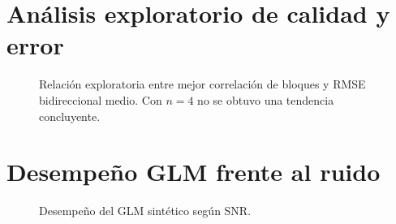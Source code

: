 \section{Análisis exploratorio de calidad y error}
\begin{figure}[H]
\centering
{}
\caption{Relación exploratoria entre mejor correlación de bloques y RMSE bidireccional medio. Con $n=4$ no se obtuvo una tendencia concluyente.}
\end{figure}

\section{Desempeño GLM frente al ruido}
\begin{figure}[H]
\centering
{}
\caption{Desempeño del GLM sintético según SNR.}
\end{figure}

